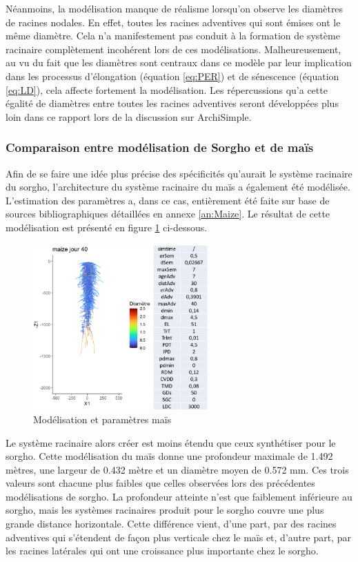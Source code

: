 Néanmoins, la modélisation manque de réalisme lorsqu'on observe les diamètres de racines nodales.
En effet, toutes les racines adventives qui sont émises ont le même diamètre.
Cela n'a manifestement pas conduit à la formation de système racinaire complètement incohérent lors de ces modélisations.
Malheureusement, au vu du fait que les diamètres sont centraux dans ce modèle par leur implication dans les processus d'élongation (équation \ref{eq:PER}) et de sénescence (équation \ref{eq:LD}), cela affecte fortement la modélisation.
Les répercussions qu'a cette égalité de diamètres entre toutes les racines adventives seront développées plus loin dans ce rapport lors de la discussion sur ArchiSimple.

\subsubsection{Comparaison entre modélisation de Sorgho et de maïs} 

Afin de se faire une idée plus précise des spécificités qu'aurait le système racinaire du sorgho, l'architecture du système racinaire du maïs a également été modélisée.
L'estimation des paramètres a, dans ce cas, entièrement été faite sur base de sources bibliographiques détaillées en annexe \ref{an:Maize}.
Le résultat de cette modélisation est présenté en figure \ref{fig:roots_maize} ci-dessous.

\begin{figure}[ht]
\centering
\includegraphics[width=0.6\textwidth]{Image/roots_maize.png}
\caption{Modélisation et paramètres maïs}
\label{fig:roots_maize}
\end{figure}

Le système racinaire alors créer est moins étendu que ceux synthétiser pour le sorgho.
Cette modélisation du maïs donne une profondeur maximale de 1.492 mètres, une largeur de 0.432 mètre et un diamètre moyen de 0.572 mm.
Ces trois valeurs sont chacune plus faibles que celles observées lors des précédentes modélisations de sorgho.
La profondeur atteinte n'est que faiblement inférieure au sorgho, mais les systèmes racinaires produit pour le sorgho couvre une plus grande distance horizontale.
Cette différence vient, d'une part, par des racines adventives qui s'étendent de façon plus verticale chez le maïs et, d'autre part, par les racines latérales qui ont une croissance plus importante chez le sorgho.
\newline

